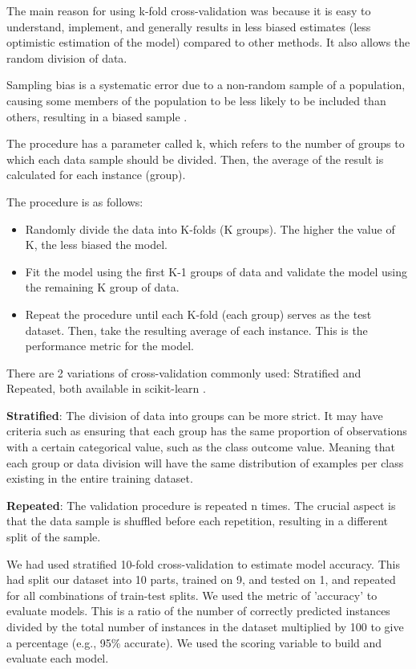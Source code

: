 \begin{enumerate}
The main reason for using k-fold cross-validation was because it is easy to understand, implement, and generally results in less biased estimates (less optimistic estimation of the model) compared to other methods. It also allows the random division of data.

Sampling bias is a systematic error due to a non-random sample of a population, causing some members of the population to be less likely to be included than others, resulting in a biased sample \cite{inbook_Cross_Validation}.

The procedure has a parameter called k, which refers to the number of groups to which each data sample should be divided. Then, the average of the result is calculated for each instance (group).

The procedure is as follows:
\begin{itemize}
    \item Randomly divide the data into K-folds (K groups). The higher the value of K, the less biased the model.
    \item Fit the model using the first K-1 groups of data and validate the model using the remaining K group of data.
    \item Repeat the procedure until each K-fold (each group) serves as the test dataset. Then, take the resulting average of each instance. This is the performance metric for the model.
\end{itemize}

There are 2 variations of cross-validation commonly used: Stratified and Repeated, both available in scikit-learn \cite{ros_validation_scikit}.

\textbf{Stratified}: The division of data into groups can be more strict. It may have criteria such as ensuring that each group has the same proportion of observations with a certain categorical value, such as the class outcome value.
Meaning that each group or data division will have the same distribution of examples per class existing in the entire training dataset.

\textbf{Repeated}: The validation procedure is repeated n times. The crucial aspect is that the data sample is shuffled before each repetition, resulting in a different split of the sample.

We had used stratified 10-fold cross-validation to estimate model accuracy.  This had split our dataset into 10 parts, trained on 9, and tested on 1, and repeated for all combinations of train-test splits. We used the metric of 'accuracy' to evaluate models. This is a ratio of the number of correctly predicted instances divided by the total number of instances in the dataset multiplied by 100 to give a percentage (e.g., 95\% accurate). We used the scoring variable to build and evaluate each model.


\end{enumerate}
